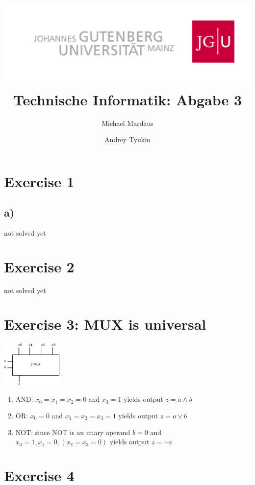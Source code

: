 \documentclass[10pt,a4paper]{scrartcl}
\author{Michael Mardaus \and Andrey Tyukin}
\title{\includegraphics[scale=0.2]{logo_schriftzug}\\
Technische Informatik: Abgabe 3}
\begin{document}
\maketitle


\section{Exercise 1}
\subsection{a)}
not solved yet

\section{Exercise 2}
not solved yet

\section{Exercise 3: MUX is universal}

\includegraphics[width=3cm]{3-3.png}
\begin{enumerate}
 \item AND: $x_0=x_1=x_2=0$ and $x_3 = 1$ yields output $z = a \land b$
 \item OR: $x_0 = 0$ and $x_1=x_2=x_3= 1$ yields output $z = a \lor b$
 \item NOT: since NOT is an unary operand $b=0$ and $x_0=1, x_1=0, (x_2=x_3=0)$ yields output $z = \lnot a$
\end{enumerate}


\section{Exercise 4}
\end{document}
